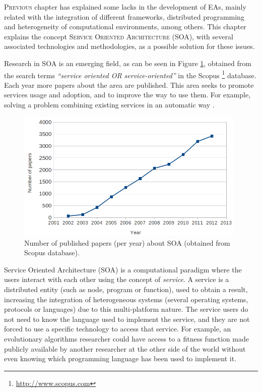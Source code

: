 \label{chap:soa}
\minitoc\mtcskip
\vfill
\lettrine{P}{revious} chapter has explained some lacks in the development of EAs, mainly related with the integration of different frameworks, distributed programming and heterogeneity of computational environments, among others. This chapter explains the concept \textsc{Service Oriented Architecture} (SOA), with several associated technologies and methodologies, as a possible solution for these issues.

Research in SOA \citep{Papazoglou2007SOA} is an emerging field, as can be seen in Figure \ref{fig:soapapers}, obtained from the search terms {\em ``service oriented OR service-oriented''} in the Scopus \footnote{\url{http://www.scopus.com}} database. Each year more papers about the area are published. This area seeks to promote services usage and adoption, and to improve the way to use them. For example, solving a problem combining existing services in an automatic way \citep{Moussa2010ServiceComposition}.





\begin{figure}
\centering
\includegraphics[width=26pc]{gfx/soa/papersYear.jpg}
\caption{Number of published papers (per year) about SOA (obtained from Scopus database).}
\label{fig:soapapers}
\end{figure}


Service Oriented Architecture (SOA) is a computational
paradigm where the users interact with each other using the concept of
{\em service}. A service is a distributed entity (such as node, program or
function), used to obtain a result, increasing the integration of heterogeneous
systems (several operating systems, protocols or languages) due to
this multi-platform nature. The service users do not need to know
the language used to implement the service, and they are not
forced to use a specific technology to access that service. For
example, an evolutionary algorithms researcher could have access to a
fitness function made publicly available by another researcher at the
other side of the world without even knowing which programming language
has been used to implement it.

